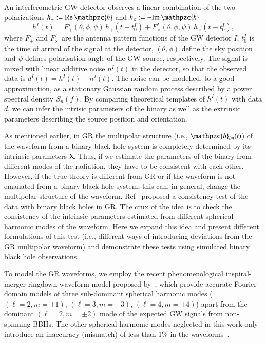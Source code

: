 \documentclass[prd,preprintnumbers,twocolumn,eqsecnum,floatfix,a4paper,nofootinbib,superscriptaddress]{revtex4}
\newcommand{\h}{\mathpzc{h}}
\newcommand{\blambda}{\bm{\lambda}}
\begin{document}
An interferometric GW detector observes a linear combination of the two polarizations $h_+ := \mathrm{Re}\,\h$ and $h_\times := - \mathrm{Im}\, \h$
\begin{equation}
h^I(t) = F^I_+(\theta, \phi, \psi) \, h_+(t-t_0^I) + F_{\times}^I(\theta, \phi, \psi)\, {h}_{\times}(t-t_0^I), 
\label{eq:det_response}
\end{equation}
where $F^I_+$ and $F^I_\times$ are the antenna pattern functions of the GW detector $I$, $t_0^I$ is the time of arrival of the signal at the detector, $(\theta, \phi)$ define the sky position and $\psi$ defines polarisation angle of the GW source, respectively. The signal is mixed with linear additive noise $n^I(t)$ in the detector, so that the observed data is $d^I(t) = h^I(t) + n^I(t)$. The noise can be modelled, to a good approximation, as a stationary Gaussian random process described by a power spectral density $S_n(f)$. By comparing theoretical templates of $h^I(t)$ with data $d$, we can infer the intrisic parameters of the binary as well as the extrinsic parameters describing the source position and orientation. 

As mentioned earlier, in GR the multipolar structure (i.e., ${\h}_{lm}(t)$) of the waveform from a binary black hole system is completely determined by its intrinsic parameters $\blambda$. Thus, if we estimate the parameters of the binary from different modes of the radiation, they have to be consistent with each other. However, if the true theory is different from GR or if the waveform is not emanated from a binary black hole system, this can, in general, change the multipolar structure of the waveform. Ref~\cite{Dhanpal:2018ufk} proposed a consistency test of the data with binary black holes in GR. The crux of the idea is to check the consistency of the intrinsic parameters estimated from different spherical harmonic modes of the waveform. Here we expand this idea and present different formulations of this test (i.e., different ways of introducing deviations from the GR multipolar waveform) and demonstrate these tests using simulated binary black hole observations. 

To model the GR waveforms, we employ the recent phenomenological inspiral-merger-ringdown waveform model proposed by~\cite{Mehta:2017jpq}, which provide accurate Fourier-domain models of three sub-dominant spherical harmonic modes ($(\ell = 2, m=\pm1)$, $(\ell = 3, m=\pm3)$, $(\ell = 4, m = \pm4)$) apart from the dominant $(\ell = 2, m = \pm2)$ mode of the expected GW signals from non-spinning BBHs. The other spherical harmonic modes neglected in this work only introduce an inaccuracy (mismatch) of less than 1\% in the waveforms~\cite{Mehta:2017jpq}. 
\end{document}
